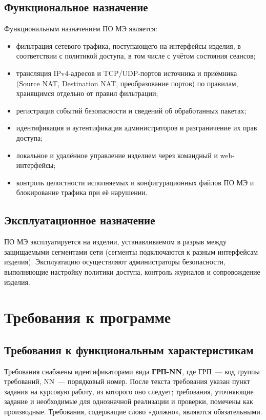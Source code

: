 \documentclass[12pt,a4paper,final]{article}
\begin{document}
\subsection{Функциональное назначение}

Функциональным назначением ПО МЭ является:
\begin{itemize}
\item фильтрация сетевого трафика, поступающего на интерфейсы изделия,
  в соответствии с политикой доступа, в том числе с учётом состояния сеансов;
\item трансляция IPv4-адресов и TCP/UDP-портов источника и приёмника
      (Source NAT, Destination NAT, преобразование портов) по правилам,
      хранящимся отдельно от правил фильтрации;
\item регистрация событий безопасности и сведений об обработанных пакетах;
\item идентификация и аутентификация администраторов и разграничение их прав доступа;
\item локальное и удалённое управление изделием через командный и web-интерфейсы;
\item контроль целостности исполняемых и конфигурационных файлов ПО МЭ
  и блокирование трафика при её нарушении.
\end{itemize}

\subsection{Эксплуатационное назначение}

ПО МЭ эксплуатируется на изделии, устанавливаемом в разрыв между защищаемыми
сегментами сети (сегменты подключаются к разным интерфейсам изделия).
Эксплуатацию осуществляют администраторы безопасности, выполняющие
настройку политики доступа, контроль журналов и сопровождение изделия.
\newpage
\section{Требования к программе}

\subsection{Требования к функциональным характеристикам}\label{sec:func}

Требования снабжены идентификаторами вида \textbf{ГРП-NN}, где ГРП~— код группы
требований, NN~— порядковый номер. После текста требования указан пункт задания
на курсовую работу, из которого оно следует; требования, уточняющие задание
и необходимые для однозначной реализации и проверки, помечены как производные.
Требования, содержащие слово «должно», являются обязательными.
\end{document}
